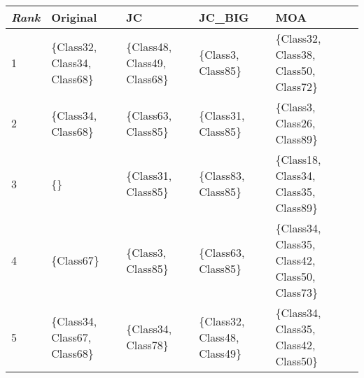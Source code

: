 \begin{tabular}{lllll}
	\toprule
	\textit{Rank} & Original                      & JC                            & JC\_BIG                       & MOA                                             \\
	\midrule
	1             & \{Class32, Class34, Class68\} & \{Class48, Class49, Class68\} & \{Class3, Class85\}           & \{Class32, Class38, Class50, Class72\}          \\
	2             & \{Class34, Class68\}          & \{Class63, Class85\}          & \{Class31, Class85\}          & \{Class3, Class26, Class89\}                    \\
	3             & \{\}                          & \{Class31, Class85\}          & \{Class83, Class85\}          & \{Class18, Class34, Class35, Class89\}          \\
	4             & \{Class67\}                   & \{Class3, Class85\}           & \{Class63, Class85\}          & \{Class34, Class35, Class42, Class50, Class73\} \\
	5             & \{Class34, Class67, Class68\} & \{Class34, Class78\}          & \{Class32, Class48, Class49\} & \{Class34, Class35, Class42, Class50\}          \\
	\bottomrule
\end{tabular}

